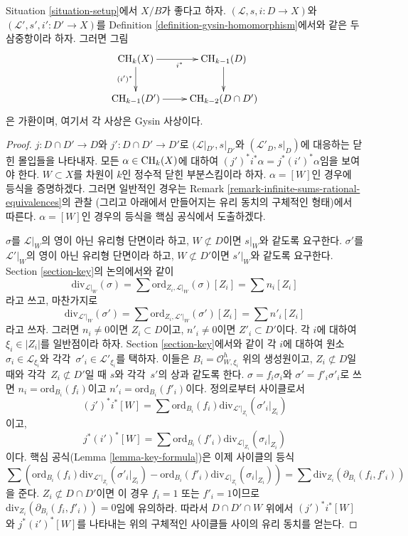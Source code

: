 \begin{lemma}
\label{lemma-gysin-commutes-gysin}
Situation \ref{situation-setup}에서 $X/B$가 좋다고 하자.
$(\mathcal{L}, s, i : D \to X)$와
$(\mathcal{L}', s', i' : D' \to X)$를 Definition
\ref{definition-gysin-homomorphism}에서와 같은 두 삼중항이라 하자.
그러면 그림
$$
\xymatrix{
\CH_k(X) \ar[r]_{i^*} \ar[d]_{(i')^*} & \CH_{k - 1}(D) \ar[d] \\
\CH_{k - 1}(D') \ar[r] & \CH_{k - 2}(D \cap D')
}
$$
은 가환이며, 여기서 각 사상은 Gysin 사상이다.
\end{lemma}

\begin{proof}
$j : D \cap D' \to D$와 $j' : D \cap D' \to D'$로
$(\mathcal{L}|_{D'}, s|_{D'}$와
$(\mathcal{L}'_D, s|_D)$에 대응하는 닫힌 몰입들을 나타내자.
모든 $\alpha \in \mathop{\mathrm{CH}}\nolimits_k(X)$에 대하여
$(j')^*i^*\alpha = j^* (i')^*\alpha$임을 보여야 한다.
$W \subset X$를 차원이 $k$인 정수적 닫힌 부분스킴이라 하자.
$\alpha = [W]$인 경우에 등식을 증명하겠다.
그러면 일반적인 경우는 Remark
\ref{remark-infinite-sums-rational-equivalences}의 관찰
(그리고 아래에서 만들어지는 유리 동치의 구체적인 형태)에서 따른다.
$\alpha = [W]$인 경우의 등식을 핵심 공식에서 도출하겠다.

\medskip\noindent
$\sigma$를 $\mathcal{L}|_W$의 영이 아닌 유리형 단면이라 하고,
$W \not \subset D$이면 $s|_W$와 같도록 요구한다.
$\sigma'$를 $\mathcal{L}'|_W$의 영이 아닌 유리형 단면이라 하고,
$W \not \subset D'$이면 $s'|_W$와 같도록 요구한다.
Section \ref{section-key}의 논의에서와 같이
$$
\text{div}_{\mathcal{L}|_W}(\sigma) =
\sum \text{ord}_{Z_i, \mathcal{L}|_W}(\sigma)[Z_i] = \sum n_i[Z_i]
$$
라고 쓰고, 마찬가지로
$$
\text{div}_{\mathcal{L}'|_W}(\sigma') =
\sum \text{ord}_{Z_i, \mathcal{L}'|_W}(\sigma')[Z_i] = \sum n'_i[Z_i]
$$
라고 쓰자. 그러면 $n_i \not = 0$이면 $Z_i \subset D$이고,
$n'_i \not = 0$이면 $Z'_i \subset D'$이다.
각 $i$에 대하여 $\xi_i \in |Z_i|$를 일반점이라 하자.
Section \ref{section-key}에서와 같이 각 $i$에 대하여 원소
$\sigma_i \in \mathcal{L}_{\xi_i}$와 각각\ 
$\sigma'_i \in \mathcal{L}'_{\xi_i}$를 택하자. 이들은
$B_i = \mathcal{O}_{W, \xi_i}^h$ 위의 생성원이고,
$Z_i \not \subset D$일 때와 각각\ $Z_i \not \subset D'$일 때
$s$와 각각\ $s'$의 상과 같도록 한다.
$\sigma = f_i \sigma_i$와 $\sigma' = f'_i\sigma'_i$로 쓰면
$n_i = \text{ord}_{B_i}(f_i)$이고
$n'_i = \text{ord}_{B_i}(f'_i)$이다.
정의로부터 사이클로서
$$
(j')^*i^*[W] =
\sum \text{ord}_{B_i}(f_i) \text{div}_{\mathcal{L}'|_{Z_i}}(\sigma'_i|_{Z_i})
$$
이고,
$$
j^*(i')^*[W] =
\sum \text{ord}_{B_i}(f'_i) \text{div}_{\mathcal{L}|_{Z_i}}(\sigma_i|_{Z_i})
$$
이다. 핵심 공식(Lemma \ref{lemma-key-formula})은 이제 사이클의 등식
$$
\sum \left(
\text{ord}_{B_i}(f_i) \text{div}_{\mathcal{L}'|_{Z_i}}(\sigma'_i|_{Z_i}) -
\text{ord}_{B_i}(f'_i) \text{div}_{\mathcal{L}|_{Z_i}}(\sigma_i|_{Z_i})
\right) =
\sum \text{div}_{Z_i}(\partial_{B_i}(f_i, f'_i))
$$
을 준다. $Z_i \not \subset D \cap D'$이면 이 경우
$f_i = 1$ 또는 $f'_i = 1$이므로
$\text{div}_{Z_i}(\partial_{B_i}(f_i, f'_i)) = 0$임에 유의하라.
따라서 $D \cap D' \cap W$ 위에서 $(j')^*i^*[W]$와
$j^*(i')^*[W]$를 나타내는 위의 구체적인 사이클들 사이의
유리 동치를 얻는다.
\end{proof}


